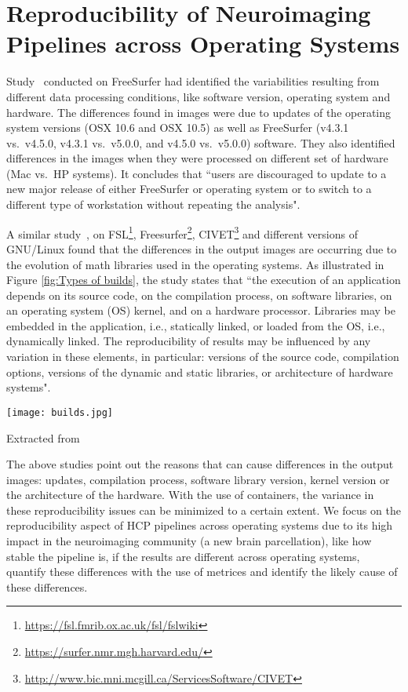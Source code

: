 \section{Reproducibility of Neuroimaging Pipelines across Operating Systems}\label{reproducibility_neuroimaging}

Study~\cite{10.1371/journal.pone.0038234} conducted on FreeSurfer had identified the variabilities resulting from different data processing conditions, like software version, operating system and hardware. The differences found in images were due to updates of the operating system versions (OSX 10.6 and OSX 10.5) as well as FreeSurfer (v4.3.1 vs.\ v4.5.0, v4.3.1 vs.\ v5.0.0, and v4.5.0 vs.\ v5.0.0) software. They also identified differences in the images when they were processed on different set of hardware (Mac vs.\ HP systems). It concludes that ``users are discouraged to update to a new major release of either FreeSurfer or operating system or to switch to a different type of workstation without repeating the analysis".

A similar study~\cite{Gla15}, on FSL\footnote{\url{https://fsl.fmrib.ox.ac.uk/fsl/fslwiki}}, Freesurfer\footnote{\url{https://surfer.nmr.mgh.harvard.edu/}}, CIVET\footnote{\url{http://www.bic.mni.mcgill.ca/ServicesSoftware/CIVET}} and different versions of GNU/Linux found that the differences in the output images are occurring due to the evolution of math libraries used in the operating systems. As illustrated in Figure \ref{fig:Types of builds}, the study states that ``the execution of an application depends on its source code, on the compilation process, on software libraries, on an operating system (OS) kernel, and on a hardware processor. Libraries may be embedded in the application, i.e., statically linked, or loaded from the OS, i.e., dynamically linked. The reproducibility of results may be influenced by any variation in these elements, in particular: versions of the source code, compilation options, versions of the dynamic and static libraries, or architecture of hardware systems".

\begin{center}
\texttt{[image: builds.jpg]}
\label{fig:Types of builds}
\caption*{Extracted from \cite{Gla15}}
\end{center}

The above studies point out the reasons that can cause differences in the output images: updates, compilation process, software library version, kernel version or the architecture of the hardware. With the use of containers, the variance in these reproducibility issues can be minimized to a certain extent. We focus on the reproducibility aspect of HCP pipelines across operating systems due to its high impact in the neuroimaging community (a new brain parcellation), like how stable the pipeline is, if the results are different across operating systems, quantify these differences with the use of metrices and identify the likely cause of these differences.

